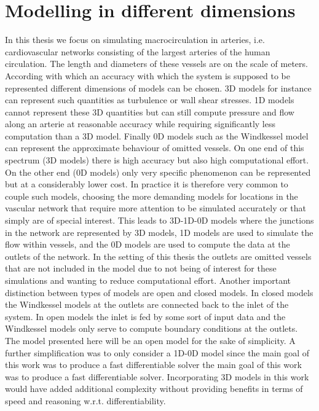\documentclass[a4paper, oneside]{discothesis}
\begin{document}
\section{Modelling in different dimensions}
In this thesis we focus on simulating macrocirculation in arteries, i.e. cardiovascular networks consisting of the largest arteries of the human circulation.
The length and diameters of these vessels are on the scale of meters.
According with which an accuracy with which the system is supposed to be represented different dimensions of models can be chosen.
3D models for instance can represent such quantities as turbulence or wall shear stresses.
1D models cannot represent these 3D quantities but can still compute pressure and flow along an arterie at reasonable accuracy while requiring significantly less computation than a 3D model.
Finally 0D models such as the Windkessel model can represent the approximate behaviour of omitted vessels.
On one end of this spectrum (3D models) there is high accuracy but also high computational effort.
On the other end (0D models) only very specific phenomenon can be represented but at a considerably lower cost.
In practice it is therefore very common to couple such models, choosing the more demanding models for locations in the vascular network that require more attention to be simulated accurately or that simply are of special interest.
This leads to 3D-1D-0D models where the junctions in the network are represented by 3D models, 1D models are used to simulate the flow within vessels, and the 0D models are used to compute the data at the outlets of the network.
In the setting of this thesis the outlets are omitted vessels that are not included in the model due to not being of interest for these simulations and wanting to reduce computational effort.
Another important distinction between types of models are open and closed models.
In closed models the Windkessel models at the outlets are connected back to the inlet of the system.
In open models the inlet is fed by some sort of input data and the Windkessel models only serve to compute boundary conditions at the outlets.
The model presented here will be an open model for the sake of simplicity.
A further simplification was to only consider a 1D-0D model since the main goal of this work was to produce a fast differentiable solver the main goal of this work was to produce a fast differentiable solver.
Incorporating 3D models in this work would have added additional complexity without providing benefits in terms of speed and reasoning w.r.t. differentiability. \cite{köppl2023dimension}
\end{document}
